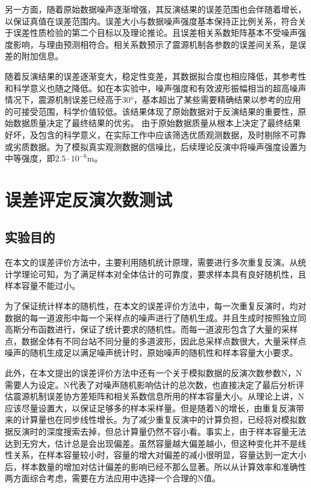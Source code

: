 另一方面，随着原始数据噪声逐渐增强，其反演结果的误差范围也会伴随着增长，以保证真值在误差范围内。误差大小与数据噪声强度基本保持正比例关系，符合关于误差性质检验的第二个目标以及理论推论。且误差相关系数矩阵基本不受噪声强度影响，与理由预测相符合。相关系数预示了震源机制各参数的误差间关系，是误差的附加信息。

随着反演结果的误差逐渐变大，稳定性变差，其数据拟合度也相应降低，其参考性和科学意义也随之降低。如在本实验中，噪声强度和有效波形振幅相当的超高噪声情况下，震源机制误差已经高于30°，基本超出了某些需要精确结果以参考的应用的可接受范围，科学价值较低。该结果体现了原始数据对于反演结果的重要性，原始数据质量决定了最终结果的优劣。
由于原始数据质量从根本上决定了最终结果好坏，及包含的科学意义，在实际工作中应该筛选优质观测数据，及时剔除不可靠或劣质数据。为了模拟真实观测数据的信噪比，后续理论反演中将噪声强度设置为中等强度，即$2.5\cdot10^{-6}$m。

\section{误差评定反演次数测试}
\subsection{实验目的}
在本文的误差评价方法中，主要利用随机统计原理，需要进行多次重复反演。从统计学理论可知，为了满足样本对全体估计的可靠度，要求样本具有良好随机性，且样本容量不能过小。

为了保证统计样本的随机性，在本文的误差评价方法中，每一次重复反演时，均对数据的每一道波形中每一个采样点的噪声进行了随机生成。并且生成时按照独立同高斯分布函数进行，保证了统计要求的随机性。而每一道波形包含了大量的采样点，数据全体有不同台站不同分量的多道波形，因此总采样点数很大，大量采样点噪声的随机生成足以满足噪声统计时，原始噪声的随机性和样本容量大小要求。

此外，在本文提出的误差评价方法中还有一个关于模拟数据的反演次数参数N，N需要人为设定。N代表了对噪声随机影响估计的总次数，也直接决定了最后分析评估震源机制误差协方差矩阵和相关系数信息所用的样本容量大小。从理论上讲，N应该尽量设置大，以保证足够多的样本采样量。但是随着N的增长，由重复反演带来的计算量也在同步线性增长。为了减少重复反演中的计算负担，已经将对模拟数据反演时的深度搜索去掉，但总计算量仍然不容小看。事实上，由于样本容量无法达到无穷大，估计总是会出现偏差。虽然容量越大偏差越小，但这种变化并不是线性关系，在样本容量较小时，容量的增大对偏差的减小很明显，容量达到一定大小后，样本数量的增加对估计偏差的影响已经不那么显著。所以从计算效率和准确性两方面综合考虑，需要在方法应用中选择一个合理的N值。

